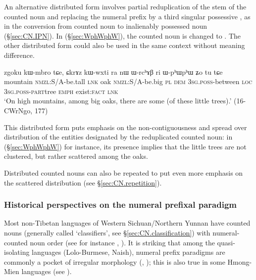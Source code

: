 An alternative distributed form involves partial reduplication of the stem of the counted noun and replacing the numeral prefix by a third singular possessive , as in the conversion from counted noun to inalienably possessed noun (§\ref{sec:CN.IPN}). In (§\ref{sec:WphWphW}), the counted noun  is changed to . The other distributed form  could also be used in the same context without meaning difference. 

\begin{exe}
\ex \label{sec:WphWphW}
\gll zgoku kɯ-mbro tɕe, ɕkrɤz kɯ-wxti ra nɯ ɯ-rcʰɤβ ri ɯ-pʰɯ\redp{}pʰɯ ʑo tu tɕe \\
mountain \textsc{nmzl}:S/A-be.tall \textsc{lnk} oak \textsc{nmzl}:S/A-be.big \textsc{pl} \textsc{dem} \textsc{3sg}.\textsc{poss}-between \textsc{loc} \textsc{3sg}.\textsc{poss}-\textsc{part}\redp{}tree \textsc{emph} exist:\textsc{fact} \textsc{lnk} \\
\glt `On high mountains, among big oaks, there are some (of these little trees).' (16-CWrNgo, 177)
\end{exe}   

This distributed form puts emphasis on the non-contiguousness and spread over distribution of the entities designated by the reduplicated counted noun: in (§\ref{sec:WphWphW}) for instance, its presence implies that the little trees are not clustered, but rather scattered among the oaks.

Distributed counted nouns can also be repeated to put even more emphasis on the scattered distribution (see §\ref{sec:CN.repetition}).

\subsubsection{Historical perspectives on the numeral prefixal paradigm} \label{sec:num.prefix.paradigm.history}
Most non-Tibetan languages of Western Sichuan/Northern Yunnan have counted nouns (generally called `classifiers', see §\ref{sec:CN.classification}) with numeral-counted noun order (see for instance \citealt{zhang14classifiers}, \citealt[163--194]{michaud17yongning}).  It is striking that among the quasi-isolating languages (Lolo-Burmese, Naish), numeral prefix paradigms are commonly a pocket of irregular morphology (\citealt{bradley05numerals}, \citealt{michaud11cl}); this is also true in some Hmong-Mien  languages (see \citealt{gerner10classifier.isolating}).

